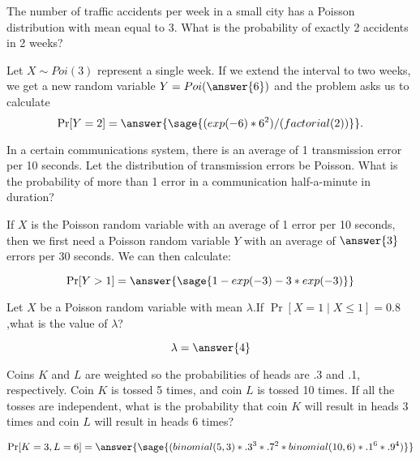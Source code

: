 \documentclass{ximera}
\begin{document}
\begin{problem} The number of traffic accidents per week in a small city has a Poisson distribution with mean equal to 3. What is the probability of exactly 2 accidents in 2 weeks? 

\begin{prompt}
Let $X\sim Poi(3)$ represent a single week. If we extend the interval to two weeks, we get a new random variable $Y=Poi(\answer{6})$ and the problem asks us to calculate
$$\Pr[Y=2]=\answer{\sage{(exp(-6)*6^2)/(factorial(2))}}.$$
\end{prompt}

\end{problem}

\begin{problem}
In a certain communications system, there is an average of 1 transmission error per 10 seconds. Let the distribution of transmission errors be Poisson. What is the probability of more than 1 error in a communication half-a-minute in duration? 



\begin{prompt}
If $X$ is the Poisson random variable with an average of 1 error per 10 seconds, then we first need a Poisson random variable $Y$ with an average of $\answer{3}$ errors per 30 seconds. We can then calculate:

$$\Pr[Y>1]=\answer{\sage{1-exp(-3)-3*exp(-3)}}$$
\end{prompt}

\end{problem}

\begin{problem}
Let $X$ be a Poisson random variable with mean $\lambda$.If $\Pr[X=1\mid X\leq1]=0.8$,what is the value of $ \lambda$? 
\begin{prompt}
$$\lambda=\answer{4}$$
\end{prompt}

\end{problem}

\begin{problem}
Coins $K$ and $L$ are weighted so the probabilities of heads are .3 and .1, respectively. Coin $K$ is tossed 5 times, and coin $L$ is tossed 10 times. If all the tosses are independent, what is the probability that coin $K$ will result in heads 3 times and coin $L$ will result in heads 6 times? 

\begin{prompt}
$$\Pr[K=3, L=6]=\answer{\sage{(binomial(5,3)*.3^3*.7^2*binomial(10,6)*.1^6*.9^4)}}$$
\end{prompt}

\end{problem}
\end{document}
